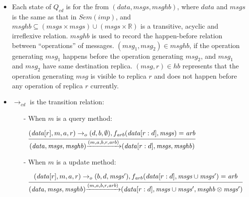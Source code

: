 \begin {itemize}
\setlength{\itemsep}{0.5pt}
\item[-] Each state of $Q_{\mathit{cd}}$ is for the from $(\mathit{data},\mathit{msgs},\mathit{msghb})$, where $\mathit{data}$ and $\mathit{msgs}$ is the same as that in $\mathit{Sem}(\mathit{imp})$, and $\mathit{msghb} \subseteq (\mathit{msgs} \times \mathit{msgs}) \cup (\mathit{msgs} \times \mathbb{R})$ is a transitive, acyclic and irreflexive relation. $\mathit{msghb}$ is used to record the happen-before relation between ``operations'' of messages. %
    $(\mathit{msg}_1,\mathit{msg}_2) \in \mathit{msghb}$, if the operation generating $\mathit{msg}_1$ happens before the operation generating $\mathit{msg}_2$, and $\mathit{msg}_1$ and $\mathit{msg}_2$ have same destination replica. $(\mathit{msg},r) \in \mathit{hb}$ represents that the operation generating $\mathit{msg}$ is visible to replica $r$ and does not happen before any operation of replica $r$ currently.

\item[-] $\rightarrow_{\mathit{cd}}$ is the transition relation:

    \begin{itemize}
    \setlength{\itemsep}{0.5pt}
    \item[-] When $m$ is a query method:

    $\begin{array}{l c} \bigfrac{ (\mathit{data}[r],m,a,r) \rightarrow_o (d,b,\emptyset),f_{\mathit{arb}}(\mathit{data}[r:d],\mathit{msgs}) = \mathit{arb}} {(\mathit{data},\mathit{msgs},\mathit{msghb}) {\xrightarrow{(m,a,b,r,\mathit{arb})}} (\mathit{data}[r:d],\mathit{msgs},\mathit{msghb})} \end{array}$

    \item[-] When $m$ is a update method:

    $\begin{array}{l c} \bigfrac{ (\mathit{data}[r],m,a,r) \rightarrow_o (b,d,\mathit{msgs}'), f_{\mathit{arb}}(\mathit{data}[r:d], \mathit{msgs} \cup \mathit{msgs}') = \mathit{arb} } {(\mathit{data},\mathit{msgs},\mathit{msghb}) {\xrightarrow{(m,a,b,r,\mathit{arb})}} (\mathit{data}[r:d],\mathit{msgs} \cup \mathit{msgs}',\mathit{msghb} \otimes \mathit{msgs}')} \end{array}$


\end{itemize}
\end{itemize}
